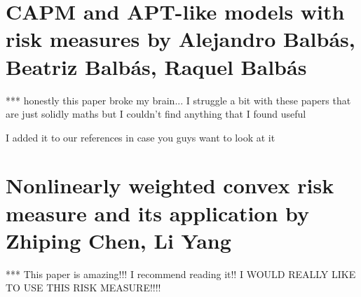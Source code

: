 \documentclass[12pt,a4paper]{article}
\begin{document}
\section{CAPM and APT-like models with risk measures by Alejandro Balb{\'a}s, Beatriz Balb{\'a}s, Raquel Balb{\'a}s}
\label{sec:4}

*** honestly this paper broke my brain... I struggle a bit with these papers that are just solidly maths but I couldn't find anything that I found useful

I added it to our references in case you guys want to look at it \cite{BALBAS20101166}



\section{Nonlinearly weighted convex risk measure and its application by Zhiping Chen, Li Yang}
\label{sec:5}

*** This paper is amazing!!! I recommend reading it!! I WOULD REALLY LIKE TO USE THIS RISK MEASURE!!!!
\end{document}

